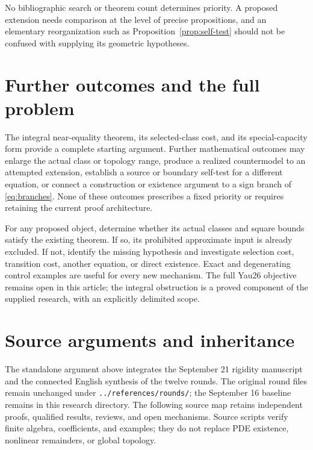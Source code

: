 \documentclass[11pt,a4paper]{article}
\theoremstyle{definition}
\theoremstyle{remark}
\numberwithin{equation}{section}
\begin{document}
No bibliographic search or theorem count determines priority. A proposed
extension needs comparison at the level of precise propositions, and
an elementary reorganization such as Proposition~\ref{prop:self-test}
should not be confused with supplying its geometric hypotheses.

\section{Further outcomes and the full problem}\label{sec:outcomes}
The integral near-equality theorem, its selected-class cost, and its
special-capacity form provide a complete starting argument. Further
mathematical outcomes may enlarge the actual class or topology range,
produce a realized countermodel to an attempted extension, establish a
source or boundary self-test for a different equation, or connect a
construction or existence argument to a sign branch of
\eqref{eq:branches}. None of these outcomes prescribes a fixed priority
or requires retaining the current proof architecture.

For any proposed object, determine whether its actual classes and square
bounds satisfy the existing theorem. If so, its prohibited approximate
input is already excluded. If not, identify the missing hypothesis and
investigate selection cost, transition cost, another equation, or direct
existence. Exact and degenerating control examples are useful for every
new mechanism. The full Yau26 objective remains open in this article;
the integral obstruction is a proved component of the supplied research,
with an explicitly delimited scope.

\appendix
\section{Source arguments and inheritance}\label{sec:sources}
The standalone argument above integrates the September 21 rigidity
manuscript and the connected English synthesis of the twelve rounds.
The original round files remain unchanged under
\texttt{../references/rounds/}; the September 16 baseline remains in this
research directory. The following source map retains independent proofs,
qualified results, reviews, and open mechanisms. Source scripts verify
finite algebra, coefficients, and examples; they do not replace PDE
existence, nonlinear remainders, or global topology.
\end{document}

